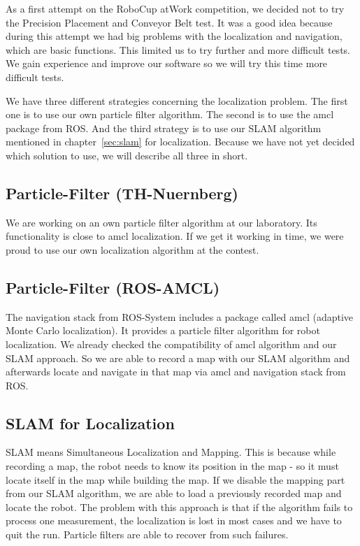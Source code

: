 As a first attempt on the RoboCup atWork  competition, we decided not to try the Precision Placement and Conveyor Belt test. It was a good idea because during this attempt we had big problems with the localization and navigation, which are basic functions. This limited us to try further and more difficult tests. We gain experience and improve our software so we will try this time more difficult tests.

We have three different strategies concerning the localization problem. The first one is to use our own particle filter algorithm. The second is to use the amcl package from ROS. And the third strategy is to use our SLAM algorithm mentioned in chapter~\ref{sec:slam} for localization. Because we have not yet decided which solution to use, we will describe all three in short.

\subsection{Particle-Filter (TH-Nuernberg)}
We are working on an own particle filter algorithm at our laboratory. Its functionality is close to amcl localization. If we get it working in time, we were proud to use our own localization algorithm at the contest.

\subsection{Particle-Filter (ROS-AMCL)}
The navigation stack from ROS-System includes a package called amcl (adaptive Monte Carlo localization). It provides a particle filter algorithm for robot localization. We already checked the compatibility of amcl algorithm and our SLAM approach. So we are able to record a map with our SLAM algorithm and afterwards locate and navigate in that map via amcl and navigation stack from ROS.

\subsection{SLAM for Localization}
SLAM means Simultaneous Localization and Mapping. This is because while recording a map, the robot needs to know its position in the map - so it must locate itself in the map while building the map. If we disable the mapping part from our SLAM algorithm, we are able to load a previously recorded map and locate the robot. The problem with this approach is that if the algorithm fails to process one measurement, the localization is lost in most cases and we have to quit the run. Particle filters are able to recover from such failures.

